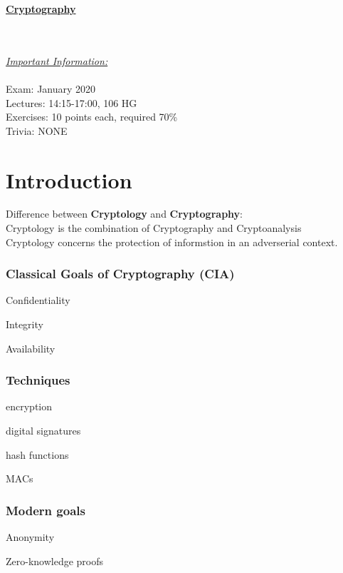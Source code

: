 \documentclass{report}
\begin{document}
 \begin{center}
 \huge{\textbf{\underline{Cryptography}}}
 \end{center}
 \hfill \\ \\
 
 \underline{\textit{Important Information:}} \\ \\
 Exam: January 2020\\
 Lectures: 14:15-17:00, 106 HG\\
 Exercises: 10 points each, required 70\% \\
 Trivia: NONE
 
 {\let\clearpage\relax \chapter{Introduction}}
 Difference between \textbf{Cryptology} and \textbf{Cryptography}: \\
 Cryptology is the combination of Cryptography and Cryptoanalysis \\
 Cryptology concerns the protection of informstion in an adverserial context. \\
 \subsection{Classical Goals of Cryptography (CIA)}
 \begin{compactenum}[$\bullet$]
 	\item Confidentiality
 	\item Integrity
 	\item Availability
 \end{compactenum}
 \subsection{Techniques}
 \begin{compactenum}[$\bullet$]
 	\item encryption
 	\item digital signatures
 	\item hash functions
 	\item MACs
 \end{compactenum}
 \subsection{Modern goals}
 \begin{compactenum}[$\bullet$]
 	\item Anonymity
 	\item Zero-knowledge proofs
 \end{compactenum}
 
\end{document}
